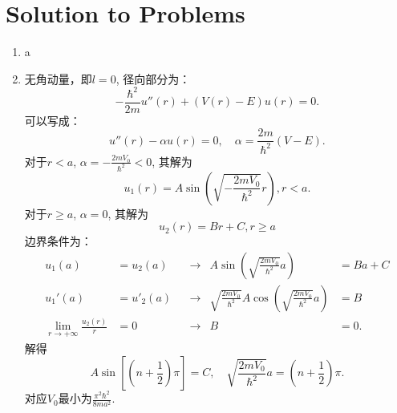 \section*{Solution to Problems}
\begin{enumerate}
    \item a
    \item 无角动量，即$l=0$, 径向部分为：
        \begin{equation}
                -\frac{\hbar^2}{2m}u''(r)+(V(r)-E)u(r)=0.
        \end{equation}
        可以写成：
        \begin{equation}
            u''(r)-\alpha u(r)=0,\quad \alpha = \frac{2m}{\hbar^2}(V-E).
        \end{equation}
        对于$r<a$, $\alpha=-\frac{2mV_0}{\hbar^2}<0$, 其解为 
        \begin{equation}
            u_1(r)=A\sin\left(\sqrt{-\frac{2mV_0}{\hbar^2}}r\right),r<a.
        \end{equation}
        对于$r\ge a$, $\alpha=0$, 其解为 
        \begin{equation}
            u_2(r)=Br+C, r\ge a
        \end{equation}
        边界条件为：
        \begin{align}
            u_1(a)&=u_2(a) &&\to &A\sin\left(\sqrt{\frac{2mV_0}{\hbar^2}}a\right)&=Ba+C\\
            u_1'(a)&=u'_2(a) &&\to &\sqrt{\frac{2mV_0}{\hbar^2}}A\cos\left(\sqrt{\frac{2mV_0}{\hbar^2}}a\right)&=B\\
            \lim_{r\to+\infty}\frac{u_2(r)}{r}&=0 &&\to &B&=0.
        \end{align}
        解得\begin{equation}
            A\sin[(n+\frac{1}{2})\pi]=C, \quad\sqrt{\frac{2mV_0}{\hbar^2}}a=(n+\frac{1}{2})\pi.
        \end{equation}
        对应$V_0$最小为$\frac{\pi^2\hbar^2}{8ma^2}$.
\end{enumerate}


